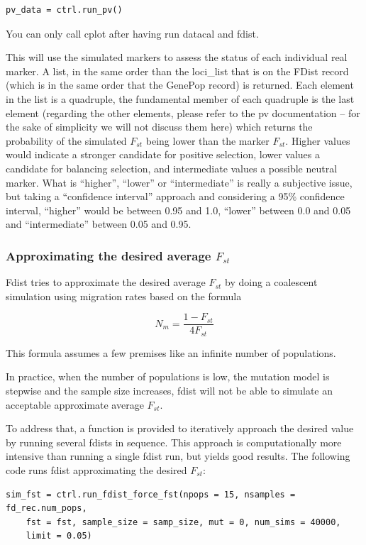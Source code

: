 \documentclass{report}
\begin{document}
\begin{verbatim}
pv_data = ctrl.run_pv()
\end{verbatim}

You can only call cplot after having run datacal and fdist.

This will use the simulated markers to assess the status of each
individual real marker. A list, in the same order than the loci\_list
that is on the FDist record (which is in the same order that the GenePop
record) is returned. Each element in the list is a quadruple, the
fundamental member of each quadruple is the last element (regarding the
other elements, please refer to the pv documentation -- for the
sake of simplicity we will not discuss them here) which returns the
probability of the simulated $F_{st}$ being lower than the marker $F_{st}$.
Higher values would indicate a stronger candidate for positive selection,
lower values a candidate for balancing selection, and intermediate values
a possible neutral marker. What is ``higher'', ``lower'' or ``intermediate''
is really a subjective issue, but taking a ``confidence interval'' approach
and considering a 95\% confidence interval, ``higher'' would be between 0.95
and 1.0, ``lower'' between 0.0 and 0.05 and ``intermediate'' between 0.05 and
0.95.

\subsubsection{Approximating the desired average $F_{st}$}

Fdist tries to approximate the desired average $F_{st}$ by doing a
coalescent simulation using migration rates based on the formula

\[ N_{m} = \frac{1 - F_{st}}{4F_{st}} \]

This formula assumes a few premises like an infinite number of populations.

In practice, when the number of populations is low, the mutation model
is stepwise and the sample size increases, fdist will not be able to
simulate an acceptable approximate average $F_{st}$.

To address that, a function is provided to iteratively approach the desired
value by running several fdists in sequence. This approach is computationally
more intensive than running a single fdist run, but yields good results.
The following code runs fdist approximating the desired $F_{st}$:

\begin{verbatim}
sim_fst = ctrl.run_fdist_force_fst(npops = 15, nsamples = fd_rec.num_pops,
    fst = fst, sample_size = samp_size, mut = 0, num_sims = 40000,
    limit = 0.05)
\end{verbatim}
\end{document}
